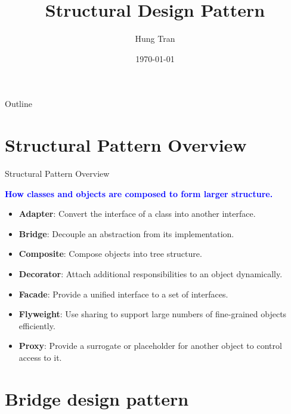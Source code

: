 \documentclass[13pt]{beamer}
\title[Design Pattern]{Structural Design Pattern}
\author{Hung Tran}
\institute{Fpt software}
\date{\today}
\begin{document}
\begin{frame}
	\titlepage
\end{frame}

\begin{frame}{Outline}
	\tableofcontents
\end{frame}

\section{Structural Pattern Overview}

\begin{frame}{Structural Pattern Overview}
	\begin{center}
		\textcolor{blue}{\textbf{How classes and objects are composed to form larger structure.}}
	\end{center}
	\begin{itemize}
		\item \textbf{Adapter}: Convert the interface of a class into another interface.
		\item \textbf{Bridge}: Decouple an abstraction from its implementation.
		\item \textbf{Composite}: Compose objects into tree structure.
		\item \textbf{Decorator}: Attach additional responsibilities to an object dynamically.
		\item \textbf{Facade}: Provide a unified interface to a set of interfaces.
		\item \textbf{Flyweight}: Use sharing to support large numbers of fine-grained objects efficiently.
		\item \textbf{Proxy}: Provide a surrogate or placeholder for another object to control access to it.
	\end{itemize}
\end{frame}

\section{Bridge design pattern}
\end{document}
